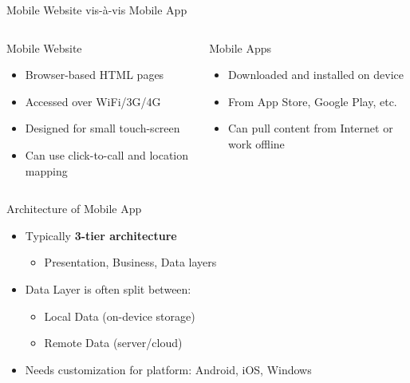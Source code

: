 \documentclass[aspectratio=169, xcolor=dvipsnames]{beamer}
\begin{document}
\begin{frame}{Mobile Website vis-\`a-vis Mobile App}
    \begin{columns}[T]
        \begin{block}{Mobile Website}
            \begin{itemize}
                \item Browser-based HTML pages
                \item Accessed over WiFi/3G/4G
                \item Designed for small touch-screen
                \item Can use click-to-call and location mapping
            \end{itemize}
        \end{block}
        \begin{exampleblock}{Mobile Apps}
            \begin{itemize}
                \item Downloaded and installed on device
                \item From App Store, Google Play, etc.
                \item Can pull content from Internet or work offline
            \end{itemize}
        \end{exampleblock}
    \end{columns}
\end{frame}

\begin{frame}{Architecture of Mobile App}
    \begin{itemize}[<+->]
        \item Typically \textbf{3-tier architecture}
        \begin{itemize}
            \item[$\triangleright$] Presentation, Business, Data layers
        \end{itemize}
        \item Data Layer is often split between:
        \begin{itemize}
            \item[$\triangleright$] Local Data (on-device storage)
            \item[$\triangleright$] Remote Data (server/cloud)
        \end{itemize}
        \item Needs customization for platform: Android, iOS, Windows
    \end{itemize}
\end{frame}
\end{document}
